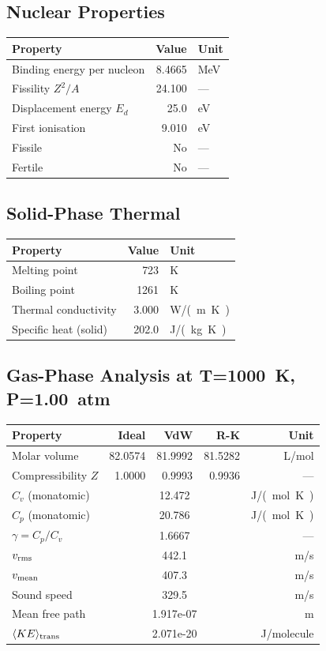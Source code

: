 \documentclass[11pt,a4paper]{article}
\begin{document}
\subsection{Nuclear Properties}
\begin{tabular}{lrl}
  \toprule
  Property & Value & Unit \\
  \midrule
  Binding energy per nucleon & 8.4665 & \si{MeV} \\
  Fissility $Z^2/A$ & 24.100 & --- \\
  Displacement energy $E_d$ & 25.0 & \si{eV} \\
  First ionisation & 9.010 & \si{eV} \\
  Fissile & No & --- \\
  Fertile & No & --- \\
  \bottomrule
\end{tabular}

\subsection{Solid-Phase Thermal}
\begin{tabular}{lrl}
  \toprule
  Property & Value & Unit \\
  \midrule
  Melting point & 723 & \si{K} \\
  Boiling point & 1261 & \si{K} \\
  Thermal conductivity & 3.000 & \si{W/(m.K)} \\
  Specific heat (solid) & 202.0 & \si{J/(kg.K)} \\
  \bottomrule
\end{tabular}

\subsection{Gas-Phase Analysis at T=\SI{1000}{K}, P=\SI{1.00}{atm}}
\begin{tabular}{lrrrr}
  \toprule
  Property & Ideal & VdW & R-K & Unit \\
  \midrule
  Molar volume & 82.0574 & 81.9992 & 81.5282 & \si{L/mol} \\
  Compressibility $Z$ & 1.0000 & 0.9993 & 0.9936 & --- \\
  \midrule
  $C_v$ (monatomic) & \multicolumn{3}{c}{12.472} & \si{J/(mol.K)} \\
  $C_p$ (monatomic) & \multicolumn{3}{c}{20.786} & \si{J/(mol.K)} \\
  $\gamma = C_p/C_v$ & \multicolumn{3}{c}{1.6667} & --- \\
  $v_{\rm rms}$ & \multicolumn{3}{c}{442.1} & \si{m/s} \\
  $v_{\rm mean}$ & \multicolumn{3}{c}{407.3} & \si{m/s} \\
  Sound speed & \multicolumn{3}{c}{329.5} & \si{m/s} \\
  Mean free path & \multicolumn{3}{c}{1.917e-07} & \si{m} \\
  $\langle KE \rangle_{\rm trans}$ & \multicolumn{3}{c}{2.071e-20} & \si{J/molecule} \\
  \bottomrule
\end{tabular}
\end{document}
